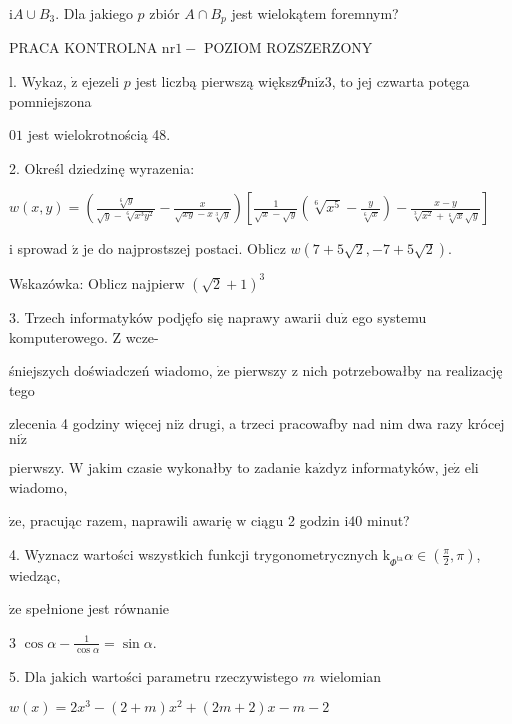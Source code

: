 \documentclass[a4paper,12pt]{article}
\begin{document}
$\mathrm{i} A\cup B_{3}$. Dla jakiego $p$ zbiór $A\cap B_{p}$ jest wielokątem foremnym?




PRACA KONTROLNA $\mathrm{n}\mathrm{r} 1 -$ POZIOM ROZSZERZONY

l. Wykaz, $\dot{\mathrm{z}}$ ejezeli $p$ jest liczbą pierwszą większ$\Phi \mathrm{n}\mathrm{i}\dot{\mathrm{z}}3$, to jej czwarta potęga pomniejszona

$01$ jest wielokrotnością 48.

2. Określ dziedzinę wyrazenia:

$w(x,y)=(\displaystyle \frac{\sqrt[6]{y}}{\sqrt{y}-\sqrt[6]{x^{3}y^{2}}}-\frac{x}{\sqrt{xy}-x\sqrt[3]{y}})[\frac{1}{\sqrt{x}-\sqrt{y}}(\sqrt[6]{x^{5}}-\frac{y}{\sqrt[6]{x}})-\frac{x-y}{\sqrt[3]{x^{2}}+\sqrt[6]{x}\sqrt{y}}]$

$\mathrm{i}$ sprowad $\acute{\mathrm{z}}$ je do najprostszej postaci. Oblicz $w(7+5\sqrt{2},-7+5\sqrt{2}).$

Wskazówka: Oblicz najpierw $(\sqrt{2}+1)^{3}$

3. Trzech informatyków podjęfo się naprawy awarii $\mathrm{d}\mathrm{u}\dot{\mathrm{z}}$ ego systemu komputerowego. $\mathrm{Z}$ wcze-

śniejszych doświadczeń wiadomo, $\dot{\mathrm{z}}\mathrm{e}$ pierwszy $\mathrm{z}$ nich potrzebowałby na realizację tego

zlecenia 4 godziny więcej $\mathrm{n}\mathrm{i}\dot{\mathrm{z}}$ drugi, a trzeci pracowafby nad nim dwa razy krócej $\mathrm{n}\mathrm{i}\dot{\mathrm{z}}$

pierwszy. $\mathrm{W}$ jakim czasie wykonałby to zadanie $\mathrm{k}\mathrm{a}\dot{\mathrm{z}}\mathrm{d}\mathrm{y}\mathrm{z}$ informatyków, $\mathrm{j}\mathrm{e}\dot{\mathrm{z}}$ eli wiadomo,

$\dot{\mathrm{z}}\mathrm{e}$, pracując razem, naprawili awarię $\mathrm{w}$ ciągu 2 godzin $\mathrm{i}40$ minut?

4. Wyznacz wartości wszystkich funkcji trygonometrycznych $\mathrm{k}_{\Phi^{\mathrm{t}\mathrm{a}}}\alpha \in (\displaystyle \frac{\pi}{2},\pi)$, wiedząc,

$\dot{\mathrm{z}}\mathrm{e}$ spełnione jest równanie

3 $\displaystyle \cos\alpha-\frac{1}{\cos\alpha}=\sin\alpha.$

5. Dla jakich wartości parametru rzeczywistego $m$ wielomian

$w(x)=2x^{3}-(2+m)x^{2}+(2m+2)x-m-2$
\end{document}
